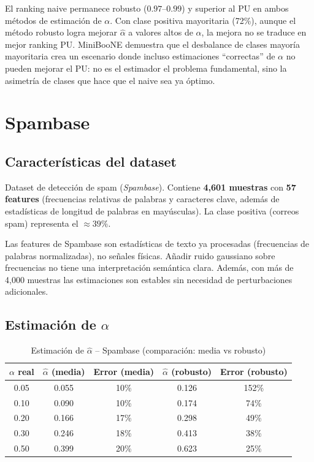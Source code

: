 \documentclass[a4paper,11pt]{article}
\begin{document}
El ranking naive permanece robusto ($0.97$--$0.99$) y superior al PU en ambos métodos de estimación de $\alpha$. Con clase positiva mayoritaria (72\%), aunque el método robusto logra mejorar $\hat{\alpha}$ a valores altos de $\alpha$, la mejora no se traduce en mejor ranking PU. MiniBooNE demuestra que el desbalance de clases mayoría mayoritaria crea un escenario donde incluso estimaciones ``correctas'' de $\alpha$ no pueden mejorar el PU: no es el estimador el problema fundamental, sino la asimetría de clases que hace que el naive sea ya óptimo.
\section{Spambase}

\subsection{Características del dataset}

Dataset de detección de spam (\textit{Spambase}). Contiene \textbf{4{,}601 muestras} con \textbf{57 features} (frecuencias relativas de palabras y caracteres clave, además de estadísticas de longitud de palabras en mayúsculas). La clase positiva (correos spam) representa el $\approx 39\%$.

Las features de Spambase son estadísticas de texto ya procesadas (frecuencias de palabras normalizadas), no señales físicas. Añadir ruido gaussiano sobre frecuencias no tiene una interpretación semántica clara. Además, con más de 4{,}000 muestras las estimaciones son estables sin necesidad de perturbaciones adicionales.

\subsection{Estimación de $\alpha$}


\begin{table}[H]
\centering
\caption{Estimación de $\hat{\alpha}$ -- Spambase (comparación: media vs robusto)}
\begin{tabular}{ccccc}
\toprule
$\alpha$ real & $\hat{\alpha}$ (media) & Error (media) & $\hat{\alpha}$ (robusto) & Error (robusto) \\
\midrule
0.05 & 0.055 & 10\% & 0.126 & 152\% \\
0.10 & 0.090 & 10\% & 0.174 & 74\% \\
0.20 & 0.166 & 17\% & 0.298 & 49\% \\
0.30 & 0.246 & 18\% & 0.413 & 38\% \\
0.50 & 0.399 & 20\% & 0.623 & 25\% \\
\bottomrule
\end{tabular}
\end{table}
\end{document}
